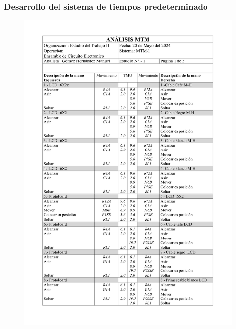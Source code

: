     \subsubsection{Desarrollo del sistema de tiempos predeterminado}
    \begin{figure}[H]
        \centering
        \includegraphics[scale=0.15]{30/img/tablaMTM1-1.pdf}

\end{figure}
